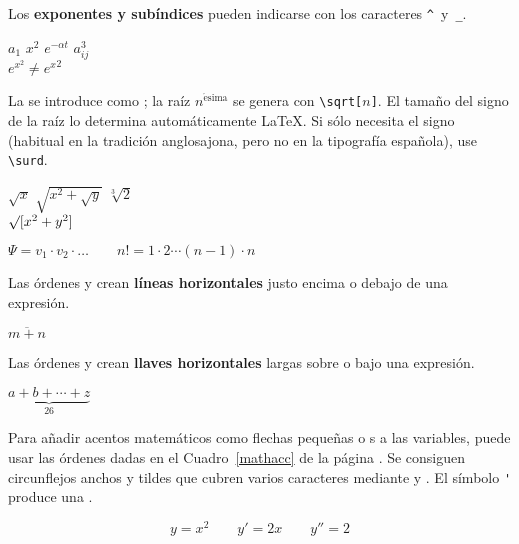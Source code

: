 Los \textbf{exponentes y subíndices} pueden indicarse con los caracteres \verb|^|~y~\verb|_|.
\begin{example}
$a_{1}$ \qquad $x^{2}$ \qquad
$e^{-\alpha t}$ \qquad
$a^{3}_{ij}$\\
$e^{x^2} \neq {e^x}^2$
\end{example}

La \textbf{} se introduce como ; la raíz $n^\mathrm{\acute esima}$ se genera con \verb|\sqrt[|$n$\verb|]|.  El tamaño del signo de la raíz lo determina automáticamente \LaTeX.  Si sólo necesita el signo (habitual en la tradición anglosajona, pero no en la tipografía española), use \verb|\surd|.
\begin{example}
$\sqrt{x}$ \qquad 
$\sqrt{ x^{2}+\sqrt{y} }$ 
\qquad $\sqrt[3]{2}$\\[3pt]
$\surd[x^2 + y^2]$
\end{example}


\begin{example}
$\Psi = v_1 \cdot v_2
 \cdot \ldots \qquad 
 n! = 1 \cdot 2 
 \cdots (n-1) \cdot n$
\end{example}

Las órdenes  y  crean \textbf{líneas horizontales} justo encima o debajo de una expresión.
\begin{example}
$\overline{m+n}$
\end{example}

Las órdenes  y  crean \textbf{llaves horizontales} largas sobre o bajo una expresión.
\begin{example}
$\underbrace{a+b+\cdots+z}_{26}$
\end{example}

 Para añadir acentos matemáticos como flechas pequeñas o s a las variables, puede usar las órdenes dadas en el Cuadro~\ref{mathacc} de la página \pageref{mathacc}.  Se consiguen circunflejos anchos y tildes que cubren varios caracteres mediante  y .  El símbolo \verb|'| produce una .
\begin{example}
\begin{displaymath}
y=x^{2}\qquad y'=2x\qquad y''=2
\end{displaymath}
\end{example}

